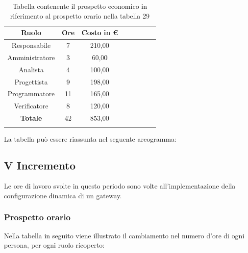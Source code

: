 			\begin{longtable}{|c|c|c|c|c|c|c|c}
				\hline
				\rowcolor{lighter-grayer}
				\textbf{Ruolo} & \textbf{Ore} & \textbf{Costo in €} \\
				\hline
				\endfirsthead
				\hline
			Responsabile 	    & 7 & 210,00\\
			\hline 
			\hline
			Amministratore	  & 3 & 60,00\\
			\hline
			\hline
			Analista 				& 4 & 100,00\\
			\hline
			\hline
			Progettista 		  & 9 & 198,00\\
			\hline
			\hline
			Programmatore 	 & 11 & 165,00\\
			\hline
			\hline
			Verificatore 		  & 8 & 120,00\\
			\hline
			\textbf{Totale} 	& 42 & 853,00\\
			\hline
				
				\caption{Tabella contenente il prospetto economico in riferimento al prospetto orario nella tabella 29}
			\end{longtable}
			\pagebreak
			
			La tabella può essere riassunta nel seguente areogramma:
		


		
		\subsection{V Incremento}
		Le ore di lavoro svolte in questo periodo sono volte all'implementazione della configurazione dinamica di un gateway.
		\subsubsection{Prospetto orario}
			Nella tabella in seguito viene illustrato il cambiamento nel numero d'ore di ogni persona, per ogni ruolo ricoperto:
			
